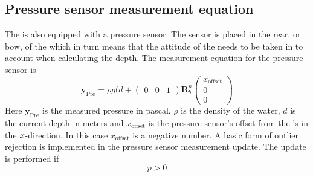 \subsection{Pressure sensor measurement equation}
The \abbrROV is also equipped with a pressure sensor. The sensor is placed in the rear, or bow, of the \abbrROV which in turn means that the attitude of the \abbrROV needs to be taken in to account when calculating the depth.
The measurement equation for the pressure sensor is
\begin{equation}
 \boldsymbol{y}_{\text{Pre}}=  \rho g (d + \begin{pmatrix}
    0 & 0 & 1
\end{pmatrix} \boldsymbol{R}^n_b 
\begin{pmatrix}
x_{\text{offset}}\\
0\\
0
\end{pmatrix}
\end{equation}
Here $\boldsymbol{y}_{\text{Pre}}$ is the measured pressure in pascal, $\rho$ is the density of the water, $d$ is the current depth in meters and $x_{\text{offset}}$ is the pressure sensor's offset from the \abbrROV's \abbrCO in the $x$-direction. In this case $x_{\textrm{offset}}$ is a negative number. A basic form of outlier rejection is implemented in the pressure sensor measurement update. The update is performed if
\begin{equation}
    p > 0
\end{equation}